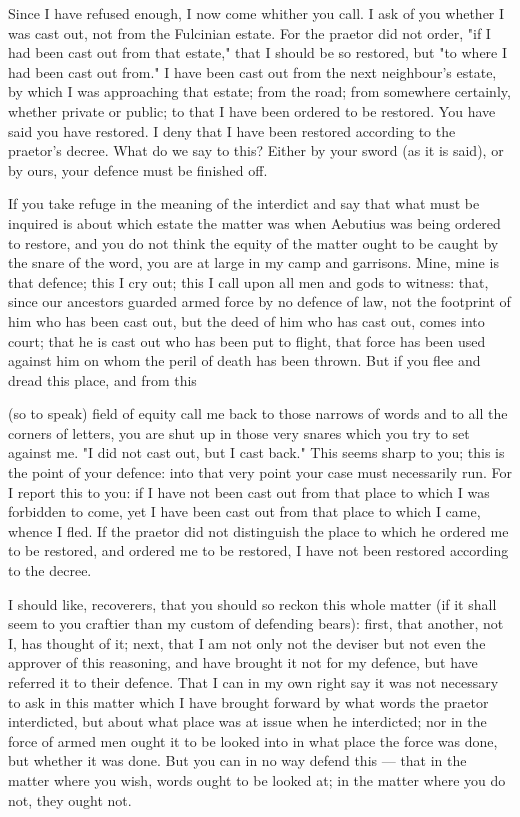  Since I have refused enough, I now come whither you call. I ask of you whether I was cast out, not from the Fulcinian estate. For the praetor did not order, "if I had been cast out from that estate," that I should be so restored, but "to where I had been cast out from." I have been cast out from the next neighbour's estate, by which I was approaching that estate; from the road; from somewhere certainly, whether private or public; to that I have been ordered to be restored. You have said you have restored. I deny that I have been restored according to the praetor's decree. What do we say to this? Either by your sword (as it is said), or by ours, your defence must be finished off.

 If you take refuge in the meaning of the interdict and say that what must be inquired is about which estate the matter was when Aebutius was being ordered to restore, and you do not think the equity of the matter ought to be caught by the snare of the word, you are at large in my camp and garrisons. Mine, mine is that defence; this I cry out; this I call upon all men and gods to witness: that, since our ancestors guarded armed force by no defence of law, not the footprint of him who has been cast out, but the deed of him who has cast out, comes into court; that he is cast out who has been put to flight, that force has been used against him on whom the peril of death has been thrown. But if you flee and dread this place, and from this

 (so to speak) field of equity call me back to those narrows of words and to all the corners of letters, you are shut up in those very snares which you try to set against me. "I did not cast out, but I cast back." This seems sharp to you; this is the point of your defence: into that very point your case must necessarily run. For I report this to you: if I have not been cast out from that place to which I was forbidden to come, yet I have been cast out from that place to which I came, whence I fled. If the praetor did not distinguish the place to which he ordered me to be restored, and ordered me to be restored, I have not been restored according to the decree.

 I should like, recoverers, that you should so reckon this whole matter (if it shall seem to you craftier than my custom of defending bears): first, that another, not I, has thought of it; next, that I am not only not the deviser but not even the approver of this reasoning, and have brought it not for my defence, but have referred it to their defence. That I can in my own right say it was not necessary to ask in this matter which I have brought forward by what words the praetor interdicted, but about what place was at issue when he interdicted; nor in the force of armed men ought it to be looked into in what place the force was done, but whether it was done. But you can in no way defend this --- that in the matter where you wish, words ought to be looked at; in the matter where you do not, they ought not.

